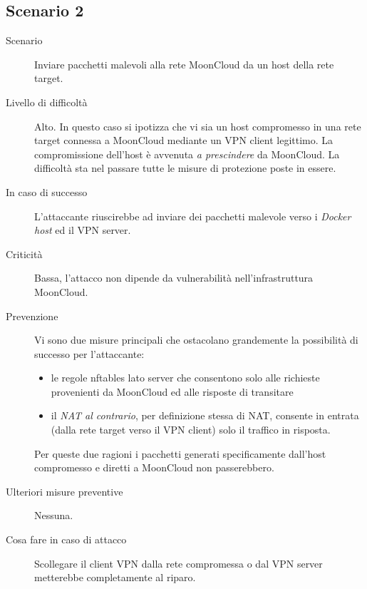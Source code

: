 \subsection{Scenario 2}
\begin{description}
    \item[Scenario]Inviare pacchetti malevoli alla rete MoonCloud da
    un host della rete target.
    \item[Livello di difficoltà]Alto. In questo caso si ipotizza che
    vi sia un host compromesso in una rete target connessa a MoonCloud
    mediante un VPN client legittimo. La compromissione dell'host è
    avvenuta \textit{a prescindere} da MoonCloud. La difficoltà sta
    nel passare tutte le misure di protezione poste in essere.
    \item[In caso di successo]L'attaccante riuscirebbe ad inviare dei
    pacchetti malevole verso i \textit{Docker host} ed il VPN server.
    \item[Criticità]Bassa, l'attacco non dipende da vulnerabilità nell'infrastruttura
    MoonCloud.
    \item[Prevenzione]Vi sono due misure principali che ostacolano grandemente
    la possibilità di successo per l'attaccante:
    \begin{itemize}
        \item le regole nftables lato server che consentono solo alle
        richieste provenienti da MoonCloud ed alle risposte di transitare
        \item il \textit{NAT al contrario}, per definizione stessa
        di NAT, consente in entrata (dalla rete target verso il VPN
        client) solo il traffico in risposta.
    \end{itemize}
    Per queste due ragioni i pacchetti generati specificamente dall'host
    compromesso e diretti a MoonCloud non passerebbero.
    \item[Ulteriori misure preventive]Nessuna.
    \item[Cosa fare in caso di attacco]Scollegare il client VPN
    dalla rete compromessa o dal VPN server metterebbe completamente
    al riparo.
\end{description}



